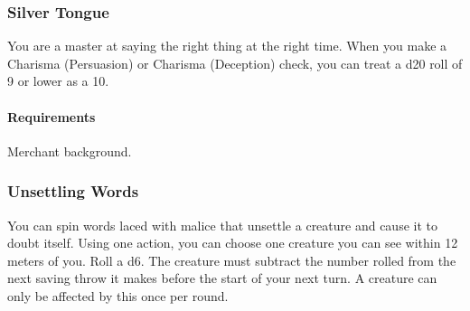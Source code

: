         \subsubsection{Silver Tongue} \label{feat::silvertongue}
            You are a master at saying the right thing at the right time.
            When you make a Charisma (Persuasion) or Charisma (Deception) check, you can treat a d20 roll of 9 or lower as a 10.
            \paragraph{Requirements} Merchant background.

        \thispagestyle{empty}

        \newpage

        \subsubsection{Unsettling Words} \label{feat::unsettlingwords}
            You can spin words laced with malice that unsettle a creature and cause it to doubt itself.
            Using one action, you can choose one creature you can see within 12 meters of you.
            Roll a d6.
            The creature must subtract the number rolled from the next saving throw it makes before the start of your next turn.
            A creature can only be affected by this once per round.

